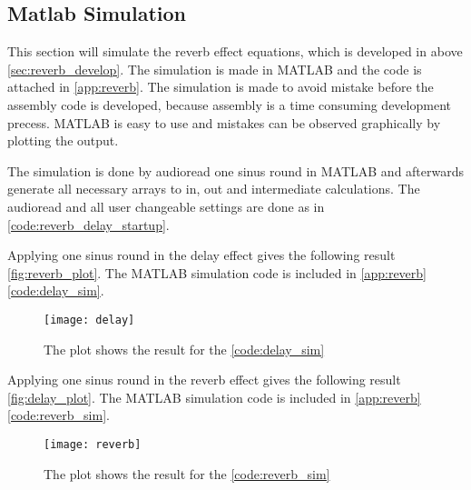 \subsection{Matlab Simulation}
This section will simulate the \gls{reverb} effect equations, which is developed in above \autoref{sec:reverb_develop}. The simulation is made in MATLAB and the code is attached in \autoref{app:reverb}. The simulation is made to avoid mistake before the assembly code is developed, because assembly is a time consuming development precess. MATLAB is easy to use and mistakes can be observed graphically by plotting the output.

The simulation is done by audioread one sinus round in MATLAB and afterwards generate all necessary arrays to in, out and intermediate calculations. The audioread and all user changeable settings are done as in \autoref{code:reverb_delay_startup}.
 


Applying one sinus round in the delay effect gives the following result \autoref{fig:reverb_plot}. The MATLAB simulation code is included in \autoref{app:reverb} \autoref{code:delay_sim}.

\begin{figure}[htbp]
	\centering
	\texttt{[image: delay]}
	\caption{The plot shows the result for the \autoref{code:delay_sim}}
	\label{fig:delay_plot}
\end{figure}



Applying one sinus round in the \gls{reverb}  effect gives the following result \autoref{fig:delay_plot}. The MATLAB simulation code is included in \autoref{app:reverb} \autoref{code:reverb_sim}.
\begin{figure}[htbp]
	\centering
	\texttt{[image: reverb]}
	\caption{The plot shows the result for the \autoref{code:reverb_sim}}
	\label{fig:reverb_plot}
\end{figure}

\newpage

